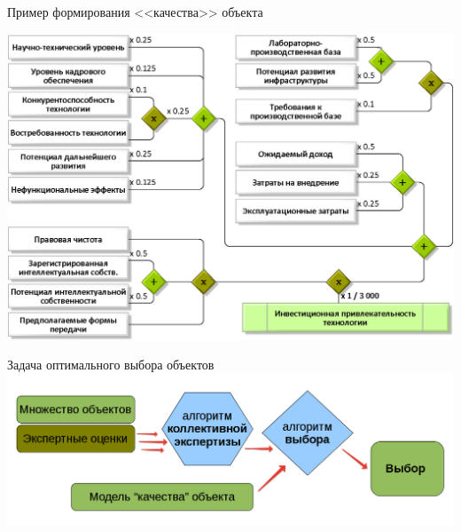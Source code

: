 \begin{frame}{Пример формирования <<качества>> объекта}
	\begin{center}
		\includegraphics[width=1\linewidth]{./pic/schemeF2}
	\end{center}
\end{frame} %

\begin{frame}{Задача оптимального выбора объектов}
	\includegraphics[width=0.8\linewidth]{./pic/globalscheme}
\end{frame} %



